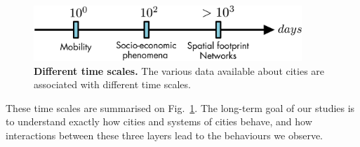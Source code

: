 \begin{figure}[!h]
    \centering
    \includegraphics[width=0.9\textwidth]{./gfx/chapter-intro/time_scales.pdf}
    \caption{{\bf Different time scales.} The various data available about
    cities are associated with different time scales.\label{fig:timescale}}
\end{figure}

These time scales are summarised on Fig.~\ref{fig:timescale}. The long-term goal
of our studies is to understand exactly how cities and systems of cities behave,
and how interactions between these three layers lead to the behaviours we
observe. 
